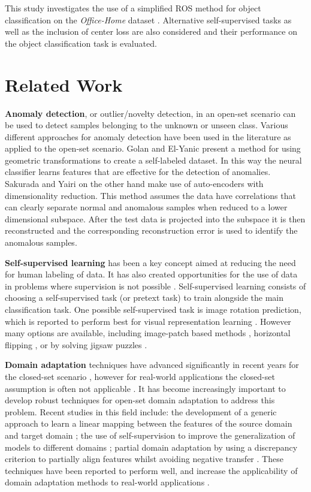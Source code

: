 \documentclass[10pt,twocolumn,letterpaper]{article}
\begin{document}
This study investigates the use of a simplified ROS method for object classification on the \textit{Office-Home} dataset \cite{OfficeHome}. Alternative self-supervised tasks as well as the inclusion of center loss are also considered and their performance on the object classification task is evaluated.


\section{Related Work}
\label{sec:relatedWork}

\textbf{Anomaly detection}, or outlier/novelty detection, in an open-set scenario can be used to detect samples belonging to the unknown or unseen class. Various different approaches for anomaly detection have been used in the literature as applied to the open-set scenario. Golan and El-Yanic \cite{Golan2018} present a method for using geometric transformations to create a self-labeled dataset. In this way the neural classifier learns features that are effective for the detection of anomalies.  Sakurada and Yairi \cite{Sakurada2014} on the other hand make use of auto-encoders with dimensionality reduction. This method assumes the data have correlations that can clearly separate normal and anomalous samples when reduced to a lower dimensional subspace. After the test data is projected into the subspace it is then reconstructed and the corresponding reconstruction error is used to identify the anomalous samples.


\textbf{Self-supervised learning} has been a key concept aimed at reducing the need for human labeling of data. It has also created opportunities for the use of data in problems where supervision is not possible \cite{Yaman2020}. Self-supervised learning consists of choosing a self-supervised task (or pretext task) to train alongside the main classification task. One possible self-supervised task is image rotation prediction, which is reported to perform best for visual representation learning \cite{Xu2019, Gidaris2018}. However many options are available, including image-patch based methods \cite{Mundhenk2018, Kim2018}, horizontal flipping \cite{Golan2018}, or by solving jigsaw puzzles \cite{Carlucci2019, Kim2018}. 


\textbf{Domain adaptation} techniques have advanced significantly in recent years for the closed-set scenario \cite{Pau2020}, however for real-world applications the closed-set assumption is often not applicable \cite{Ren2021}. It has become increasingly important to develop robust techniques for open-set domain adaptation to address this problem. Recent studies in this field include: the development of a generic approach to learn a linear mapping between the features of the source domain and target domain \cite{Pau2020}; the use of self-supervision to improve the generalization of models to different domains \cite{Carlucci2019}; partial domain adaptation by using a discrepancy criterion to partially align features whilst avoiding negative transfer \cite{Ren2021}. These techniques have been reported to perform well, and increase the applicability of domain adaptation methods to real-world applications \cite{Carlucci2019, Ren2021,Pau2020}.
\end{document}
